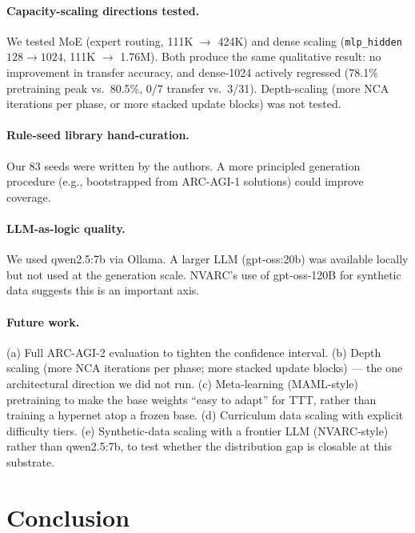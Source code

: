 \documentclass[11pt]{article}
\begin{document}
\paragraph{Capacity-scaling directions tested.} We tested MoE (expert routing, 111K $\to$ 424K) and dense scaling (\verb|mlp_hidden| $128 \to 1024$, 111K $\to$ 1.76M). Both produce the same qualitative result: no improvement in transfer accuracy, and dense-1024 actively regressed (78.1\% pretraining peak vs.\ 80.5\%, 0/7 transfer vs.\ 3/31). Depth-scaling (more NCA iterations per phase, or more stacked update blocks) was not tested.

\paragraph{Rule-seed library hand-curation.} Our 83 seeds were written by the authors. A more principled generation procedure (e.g., bootstrapped from ARC-AGI-1 solutions) could improve coverage.

\paragraph{LLM-as-logic quality.} We used qwen2.5:7b via Ollama. A larger LLM (gpt-oss:20b) was available locally but not used at the generation scale. NVARC's use of gpt-oss-120B for synthetic data \citep{sorokin2025nvarc} suggests this is an important axis.

\paragraph{Future work.} (a) Full ARC-AGI-2 evaluation to tighten the confidence interval. (b) Depth scaling (more NCA iterations per phase; more stacked update blocks) --- the one architectural direction we did not run. (c) Meta-learning (MAML-style) pretraining to make the base weights ``easy to adapt'' for TTT, rather than training a hypernet atop a frozen base. (d) Curriculum data scaling with explicit difficulty tiers. (e) Synthetic-data scaling with a frontier LLM (NVARC-style) rather than qwen2.5:7b, to test whether the distribution gap is closable at this substrate.

\section{Conclusion}
\end{document}
